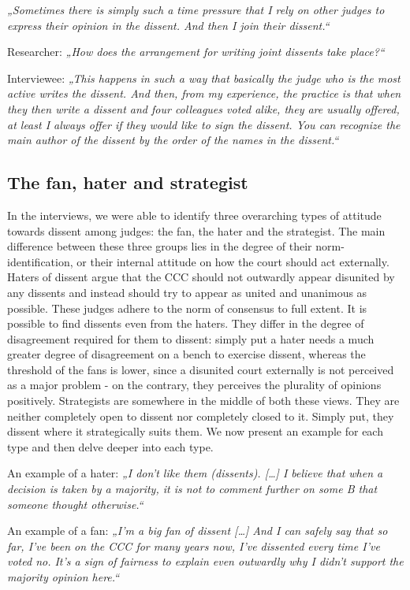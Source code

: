 \documentclass[
  11pt,
]{article}
\begin{document}
\emph{„Sometimes there is simply such a time pressure that I rely on other judges to express their opinion in the dissent. And then I join their dissent.``}

Researcher: \emph{„How does the arrangement for writing joint dissents take place?{}``}

Interviewee: \emph{„This happens in such a way that basically the judge who is the most active writes the dissent. And then, from my experience, the practice is that when they then write a dissent and four colleagues voted alike, they are usually offered, at least I always offer if they would like to sign the dissent. You can recognize the main author of the dissent by the order of the names in the dissent.``}

\subsection{The fan, hater and strategist}\label{stances}

In the interviews, we were able to identify three overarching types of attitude towards dissent among judges: the fan, the hater and the strategist. The main difference between these three groups lies in the degree of their norm-identification, or their internal attitude on how the court should act externally. Haters of dissent argue that the CCC should not outwardly appear disunited by any dissents and instead should try to appear as united and unanimous as possible. These judges adhere to the norm of consensus to full extent. It is possible to find dissents even from the haters. They differ in the degree of disagreement required for them to dissent: simply put a hater needs a much greater degree of disagreement on a bench to exercise dissent, whereas the threshold of the fans is lower, since a disunited court externally is not perceived as a major problem - on the contrary, they perceives the plurality of opinions positively. Strategists are somewhere in the middle of both these views. They are neither completely open to dissent nor completely closed to it. Simply put, they dissent where it strategically suits them. We now present an example for each type and then delve deeper into each type.

An example of a hater: \emph{„I don't like them (dissents). {[}\ldots{]} I believe that when a decision is taken by a majority, it is not to comment further on some B that someone thought otherwise.``}

An example of a fan: \emph{„I'm a big fan of dissent {[}\ldots{]} And I can safely say that so far, I've been on the CCC for many years now, I've dissented every time I've voted no. It's a sign of fairness to explain even outwardly why I didn't support the majority opinion here.``}
\end{document}
